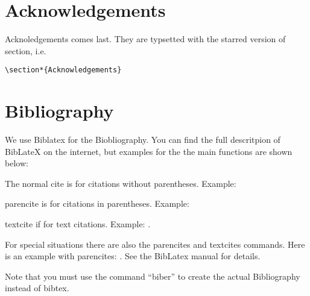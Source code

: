 \section*{Acknowledgements}

Acknoledgements comes last. They are typsetted with the starred
version of section, i.e. 

\begin{verbatim}
\section*{Acknowledgements}
\end{verbatim}

\section{Bibliography}

We use Biblatex for the Biobliography. You can find the full
descritpion of BibLateX on the internet, but examples for the the main
functions are shown below:

\bci
\item The normal cite is for citations without parentheses. Example:
  \cite[see][pg.\,12]{carrasco03}
\item parencite is for citations in parentheses. Example:
  \parencite[see][pg.\,12]{dept10}
\item textcite if for text citations. Example: 
  \textcite[see][pg.\,12]{dorer11}.
\item For special situations there are also the parencites and
  textcites commands. Here is an example with parencites: 
  \parencites(See)(and the
  introduction)[35]{fitzgerald11}[78]{dorer11}[23]{goerman07}. See the
  BibLatex manual for details. 
\eci

Note that you must use the command ``biber'' to create the actual
Bibliography instead of bibtex. 



